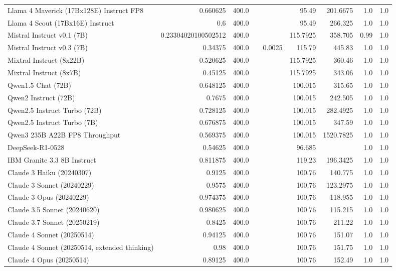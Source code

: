 \begin{table}[htp]
{\begin{tabular}{lrrrrrrrr}
Llama 4 Maverick (17Bx128E) Instruct FP8 & 0.660625 & 400.0 &  &  & 95.49 & 201.6675 & 1.0 & 1.0 \\
Llama 4 Scout (17Bx16E) Instruct & 0.6 & 400.0 &  &  & 95.49 & 266.325 & 1.0 & 1.0 \\
Mistral Instruct v0.1 (7B) & 0.23304020100502512 & 400.0 &  &  & 115.7925 & 358.705 & 0.99 & 1.0 \\
Mistral Instruct v0.3 (7B) & 0.34375 & 400.0 &  & 0.0025 & 115.79 & 445.83 & 1.0 & 1.0 \\
Mixtral Instruct (8x22B) & 0.520625 & 400.0 &  &  & 115.7925 & 360.46 & 1.0 & 1.0 \\
Mixtral Instruct (8x7B) & 0.45125 & 400.0 &  &  & 115.7925 & 343.06 & 1.0 & 1.0 \\
Qwen1.5 Chat (72B) & 0.648125 & 400.0 &  &  & 100.015 & 315.65 & 1.0 & 1.0 \\
Qwen2 Instruct (72B) & 0.7675 & 400.0 &  &  & 100.015 & 242.505 & 1.0 & 1.0 \\
Qwen2.5 Instruct Turbo (72B) & 0.728125 & 400.0 &  &  & 100.015 & 282.4925 & 1.0 & 1.0 \\
Qwen2.5 Instruct Turbo (7B) & 0.676875 & 400.0 &  &  & 100.015 & 347.59 & 1.0 & 1.0 \\
Qwen3 235B A22B FP8 Throughput & 0.569375 & 400.0 &  &  & 100.015 & 1520.7825 & 1.0 & 1.0 \\
DeepSeek-R1-0528 & 0.54625 & 400.0 &  &  & 96.685 &  & 1.0 & 1.0 \\
IBM Granite 3.3 8B Instruct & 0.811875 & 400.0 &  &  & 119.23 & 196.3425 & 1.0 & 1.0 \\
Claude 3 Haiku (20240307) & 0.9125 & 400.0 &  &  & 100.76 & 140.775 & 1.0 & 1.0 \\
Claude 3 Sonnet (20240229) & 0.9575 & 400.0 &  &  & 100.76 & 123.2975 & 1.0 & 1.0 \\
Claude 3 Opus (20240229) & 0.974375 & 400.0 &  &  & 100.76 & 118.955 & 1.0 & 1.0 \\
Claude 3.5 Sonnet (20240620) & 0.980625 & 400.0 &  &  & 100.76 & 115.215 & 1.0 & 1.0 \\
Claude 3.7 Sonnet (20250219) & 0.8425 & 400.0 &  &  & 100.76 & 211.22 & 1.0 & 1.0 \\
Claude 4 Sonnet (20250514) & 0.94125 & 400.0 &  &  & 100.76 & 151.07 & 1.0 & 1.0 \\
Claude 4 Sonnet (20250514, extended thinking) & 0.98 & 400.0 &  &  & 100.76 & 151.75 & 1.0 & 1.0 \\
Claude 4 Opus (20250514) & 0.89125 & 400.0 &  &  & 100.76 & 152.49 & 1.0 & 1.0 \\

\end{tabular}}
\end{table}
